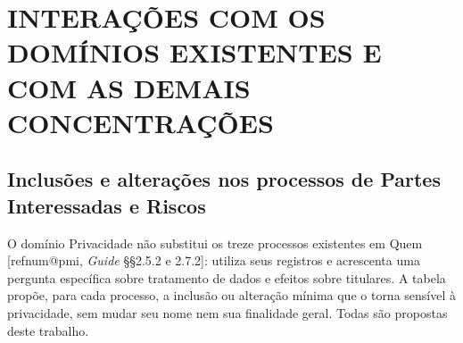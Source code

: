 \documentclass[12pt,a4paper,article,oneside,english,brazil]{abntex2}
\makeatletter
\newcommand{\refnum}[1]{\csname refnum@#1\endcsname}
\makeatother
\begin{document}
\section{INTERAÇÕES COM OS DOMÍNIOS EXISTENTES E COM AS DEMAIS CONCENTRAÇÕES}
\subsection{Inclusões e alterações nos processos de Partes Interessadas e Riscos}

O domínio Privacidade não substitui os treze processos existentes em Quem [\refnum{pmi}, \textit{Guide} §§2.5.2 e 2.7.2]: utiliza seus registros e acrescenta uma pergunta específica sobre tratamento de dados e efeitos sobre titulares. A tabela propõe, para cada processo, a inclusão ou alteração mínima que o torna sensível à privacidade, sem mudar seu nome nem sua finalidade geral. Todas são propostas deste trabalho.
\end{document}
